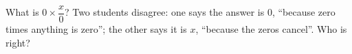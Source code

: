 What is $0\times\dfrac{x}{0}$? Two students disagree: one says the answer is $0$, ``because zero times anything is zero''; the other says it is $x$, ``because the zeros cancel''. Who is right?
